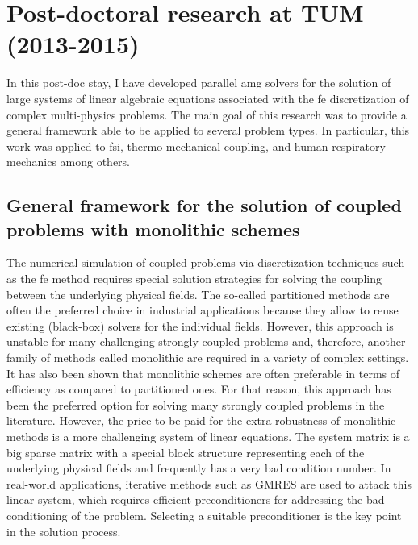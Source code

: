 \documentclass{article}
\newcommand{\bemph}[1]{#1}
\begin{document}
\section{Post-doctoral research at TUM (2013-2015)} \label{sec:tum}

In this post-doc stay, \bemph{I have developed parallel \ac{amg} solvers for the solution of large systems of linear algebraic equations associated with the \ac{fe} discretization of complex multi-physics problems}.  The main goal of this research was to provide a general framework able to be applied to several problem types. In particular, this work was applied to \ac{fsi}, thermo-mechanical coupling, and human respiratory mechanics among others.

\subsection{General framework for the solution of coupled problems with monolithic schemes}

The numerical simulation of coupled problems via discretization techniques such as the \ac{fe} method requires special solution strategies for solving the coupling between
the underlying physical fields. The so-called partitioned methods \cite{Felippa2001} are often the preferred choice in industrial applications because they allow to reuse existing (black-box) solvers for the individual fields. However, this approach is unstable for many challenging strongly coupled problems \cite{Forster2007} and, therefore, another family of methods called monolithic are required in a variety of complex settings. It has also been shown that monolithic schemes are often preferable in terms of efficiency as compared to partitioned ones. For that reason, this approach has been the preferred option for solving many strongly coupled problems in the literature. However, the price to be paid for the extra robustness of monolithic methods is a more challenging system of linear equations. The system matrix is a big sparse matrix with a special block structure representing each of the underlying physical fields and frequently has a very bad condition number. In real-world applications, iterative methods such as GMRES are used to attack this linear system, which requires efficient preconditioners for addressing the bad conditioning of the problem. Selecting a suitable preconditioner is the key point in the solution process.
\end{document}
